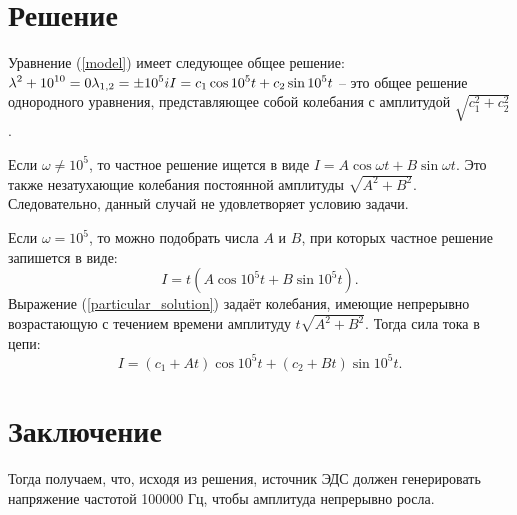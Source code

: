\documentclass[a4paper,14pt]{extarticle}
\begin{document}
    \section{Решение}
    Уравнение (\ref{model}) имеет следующее общее решение: \\
    $\displaystyle
    \lambda^2 + 10^{10} = 0 \\
    \lambda_{1, 2} = \pm 10^5 i \\
    I = c_1 \cos 10^5 t + c_2 \sin 10^5 t
    $ -- это общее решение однородного уравнения, представляющее собой колебания с амплитудой $\sqrt{c_1^2 + c_2^2}$.

    Если $\omega \neq 10^5$, то частное решение ищется в виде
    $I = A \cos \omega t + B \sin \omega t$. 
    Это также незатухающие колебания постоянной амплитуды $\sqrt{A^2 + B^2}$.
    Следовательно, данный случай не удовлетворяет условию задачи.

    Если $\omega = 10^5$, то можно подобрать числа $A$ и $B$, при которых частное решение запишется в виде:
    \begin{equation} \label{particular_solution}
        I = t(A \cos 10^5 t + B \sin 10^5 t).
    \end{equation}
    Выражение (\ref{particular_solution}) задаёт колебания, имеющие непрерывно возрастающую с течением времени амплитуду $t\sqrt{A^2 + B^2}$.
    Тогда сила тока в цепи:
    \begin{equation*}
        I = (c_1 + At) \cos 10^5 t + (c_2 + Bt) \sin 10^5 t.
    \end{equation*}

    \section{Заключение}
    Тогда получаем, что, исходя из решения, источник ЭДС должен генерировать напряжение частотой 100000 Гц, чтобы амплитуда непрерывно росла.
\end{document}
